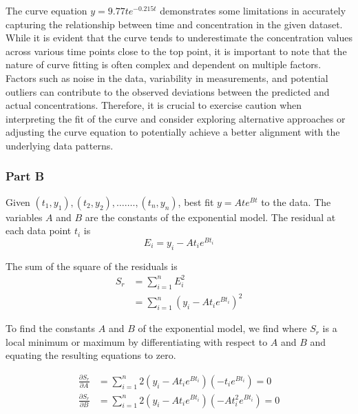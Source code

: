 \documentclass[12pt, a4paper]{article}
\numberwithin{equation}{section}
\begin{document}
The curve equation $y = 9.77te^{-0.215t}$ demonstrates some limitations in accurately capturing the relationship between time and concentration in the given dataset. While it is evident that the curve tends to underestimate the concentration values across various time points close to the top point, it is important to note that the nature of curve fitting is often complex and dependent on multiple factors. Factors such as noise in the data, variability in measurements, and potential outliers can contribute to the observed deviations between the predicted and actual concentrations. Therefore, it is crucial to exercise caution when interpreting the fit of the curve and consider exploring alternative approaches or adjusting the curve equation to potentially achieve a better alignment with the underlying data patterns.



\subsubsection{Part B}

Given $\left(t_1, y_1\right),\left(t_2, y_2\right), \ldots \ldots .,\left(t_n, y_n\right)$, best fit $y=Ate^{Bt}$ to the data. The variables $A$ and $B$ are the constants of the exponential model. The residual at each data point $t_i$ is
\begin{equation}
E_i=y_i-At_ie^{Bt_i}
\end{equation}

The sum of the square of the residuals is
\begin{equation}
\begin{aligned}
S_r & =\sum_{i=1}^n E_i^2 \\
& =\sum_{i=1}^n\left(y_i-At_ie^{Bt_i}\right)^2
\end{aligned}
\end{equation}

To find the constants $A$ and $B$ of the exponential model, we find where $S_r$ is a local minimum or maximum by differentiating with respect to $A$ and $B$ and equating the resulting equations to zero.

\begin{subequations}
\begin{align}
\frac{\partial S_r}{\partial A}&=\sum_{i=1}^n 2\left(y_i-At_ie^{Bt_i}\right)\left(-t_ie^{Bt_i}\right)=0 \\
\frac{\partial S_r}{\partial B}&=\sum_{i=1}^n 2\left(y_i-At_ie^{Bt_i}\right)\left(-At_i^2e^{Bt_i}\right)=0
\end{align}
\end{subequations}
\end{document}
